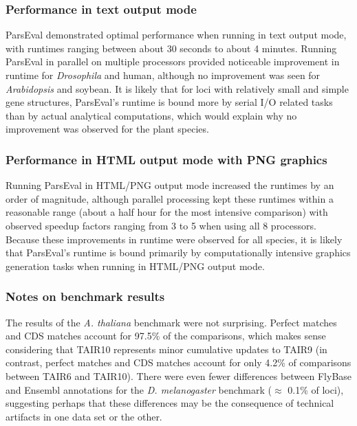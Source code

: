 \subsubsection{Performance in text output mode}
ParsEval demonstrated optimal performance when running in text output mode, with runtimes ranging between about 30 seconds to about 4 minutes.
Running ParsEval in parallel on multiple processors provided noticeable improvement in runtime for \textit{Drosophila} and human, although no improvement was seen for \textit{Arabidopsis} and soybean.
It is likely that for loci with relatively small and simple gene structures, ParsEval's runtime is bound more by serial I/O related tasks than by actual analytical computations, which would explain why no improvement was observed for the plant species.


\subsubsection{Performance in HTML output mode with PNG graphics}
Running ParsEval in HTML/PNG output mode increased the runtimes by an order of magnitude, although parallel processing kept these runtimes within a reasonable range (about a half hour for the most intensive comparison) with observed speedup factors ranging from 3 to 5 when using all 8 processors.
Because these improvements in runtime were observed for all species, it is likely that ParsEval's runtime is bound primarily by computationally intensive graphics generation tasks when running in HTML/PNG output mode.


\subsubsection{Notes on benchmark results}
The results of the \textit{A. thaliana} benchmark were not surprising.
Perfect matches and CDS matches account for 97.5\% of the comparisons, which makes sense considering that TAIR10 represents minor cumulative updates to TAIR9 (in contrast, perfect matches and CDS matches account for only 4.2\% of comparisons between TAIR6 and TAIR10).
There were even fewer differences between FlyBase and Ensembl annotations for the \textit{D. melanogaster} benchmark ($\approx$ 0.1\% of loci), suggesting perhaps that these differences may be the consequence of technical artifacts in one data set or the other.


